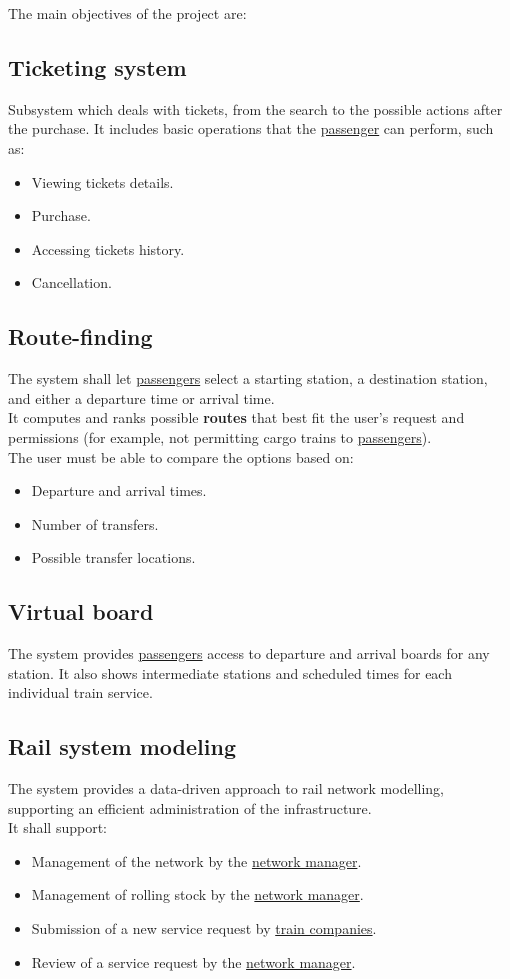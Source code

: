\documentclass[12pt]{article}
\renewcommand\bf[1]{\textbf{#1}}
\renewcommand\it[1]{\textit{#1}}
\newcommand\un[1]{\underline{#1}}
\newcommand\subs[2]{\subsection{#1}\label{#2}}
\begin{document}
\noindent The main objectives of the project are:

\subs{Ticketing system}{O.1}
Subsystem which deals with tickets, from the search to the possible actions after the purchase. 
It includes basic operations that the \un{passenger} can perform, such as:
\begin{itemize}
	\item Viewing tickets details.
	\item Purchase.
	\item Accessing tickets history.
	\item Cancellation.
\end{itemize}


\subs{Route-finding}{O.2}
The system shall let \un{passengers} select a starting station, a destination station, and either a departure time or arrival time.\\
It computes and ranks possible \bf{routes} that best fit the user's request and permissions
(for example, not permitting cargo trains to \un{passengers}).\\
The user must be able to compare the options based on:
\begin{itemize}
    \item Departure and arrival times.
    \item Number of transfers.
    \item Possible transfer locations.
\end{itemize}

\subs{Virtual board}{O.3}
The system provides \un{passengers} access to departure and arrival boards for any station. It also shows intermediate stations and scheduled times for each 
individual train service.

\subs{Rail system modeling}{O.4}
The system provides a data-driven approach to rail network modelling, supporting an efficient administration of the infrastructure.\\
It shall support:
\begin{itemize}
    \item Management of the network by the \un{network manager}.
    \item Management of rolling stock by the \un{network manager}.
    \item Submission of a new service request by \un{train companies}.
    \item Review of a service request by the \un{network manager}.
\end{itemize}
{}
\end{document}
